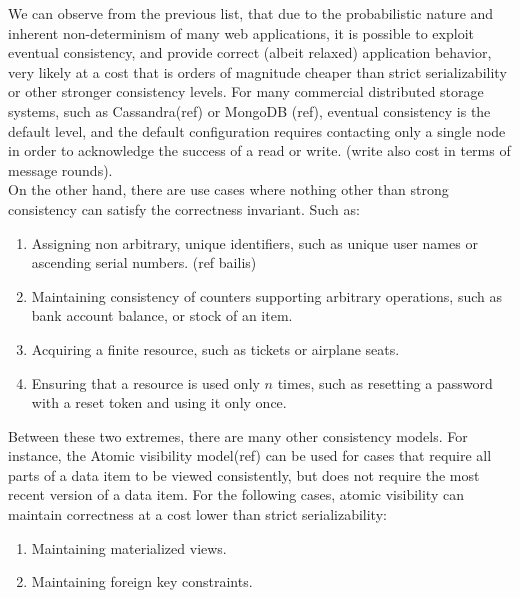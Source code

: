 We can observe from the previous list, that due to the probabilistic nature and 
inherent non-determinism of many web applications, it is possible to exploit 
eventual consistency, and provide correct (albeit relaxed) application behavior, 
very likely at a cost that is orders of magnitude cheaper than strict serializability 
or other stronger consistency levels. For many commercial distributed storage 
systems, such as Cassandra(ref) or MongoDB (ref), eventual consistency is the default
level, and the default configuration requires contacting only a single node in
order to acknowledge the success of a read or write. (write also cost in terms
of message rounds). \\

On the other hand, there are use cases where nothing other than strong consistency can
satisfy the correctness invariant. Such as:

\begin{enumerate}

\item Assigning non arbitrary, unique identifiers, such as unique user names or
ascending serial numbers. (ref bailis)

\item Maintaining consistency of counters supporting arbitrary operations, such
as bank account balance, or stock of an item. 

\item Acquiring a finite resource, such as tickets or airplane seats. 

\item Ensuring that a resource is used only $n$ times, such as resetting a
password with a reset token and using it only once. 
\end{enumerate}

 Between these two extremes, there are many other consistency models. For
 instance, the Atomic visibility model(ref) can be used for cases that
 require all parts of a data item to be viewed consistently, but does not require
 the most recent version of a data item. For the following cases, 
 atomic visibility can maintain correctness at a cost lower than strict
 serializability: 
\begin{enumerate}
\item Maintaining materialized views.
\item Maintaining foreign key constraints.
\end{enumerate}

